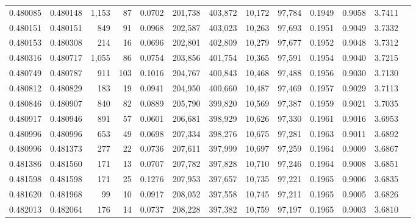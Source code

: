 \begin{tabular}{rrrrrrrrrrrrr}
0.480085 & 0.480148 & 1,153 &    87 &                                     0.0702 & 201,738 & 403,872 &  10,172 &  97,784 & 0.1949 & 0.9058 & 3.7411 \\
0.480151 & 0.480151 &   849 &    91 &                                     0.0968 & 202,587 & 403,023 &  10,263 &  97,693 & 0.1951 & 0.9049 & 3.7332 \\
0.480153 & 0.480308 &   214 &    16 &                                     0.0696 & 202,801 & 402,809 &  10,279 &  97,677 & 0.1952 & 0.9048 & 3.7312 \\
0.480316 & 0.480717 & 1,055 &    86 &                                     0.0754 & 203,856 & 401,754 &  10,365 &  97,591 & 0.1954 & 0.9040 & 3.7215 \\
0.480749 & 0.480787 &   911 &   103 &                                     0.1016 & 204,767 & 400,843 &  10,468 &  97,488 & 0.1956 & 0.9030 & 3.7130 \\
0.480812 & 0.480829 &   183 &    19 &                                     0.0941 & 204,950 & 400,660 &  10,487 &  97,469 & 0.1957 & 0.9029 & 3.7113 \\
0.480846 & 0.480907 &   840 &    82 &                                     0.0889 & 205,790 & 399,820 &  10,569 &  97,387 & 0.1959 & 0.9021 & 3.7035 \\
0.480917 & 0.480946 &   891 &    57 &                                     0.0601 & 206,681 & 398,929 &  10,626 &  97,330 & 0.1961 & 0.9016 & 3.6953 \\
0.480996 & 0.480996 &   653 &    49 &                                     0.0698 & 207,334 & 398,276 &  10,675 &  97,281 & 0.1963 & 0.9011 & 3.6892 \\
0.480996 & 0.481373 &   277 &    22 &                                     0.0736 & 207,611 & 397,999 &  10,697 &  97,259 & 0.1964 & 0.9009 & 3.6867 \\
0.481386 & 0.481560 &   171 &    13 &                                     0.0707 & 207,782 & 397,828 &  10,710 &  97,246 & 0.1964 & 0.9008 & 3.6851 \\
0.481598 & 0.481598 &   171 &    25 &                                     0.1276 & 207,953 & 397,657 &  10,735 &  97,221 & 0.1965 & 0.9006 & 3.6835 \\
0.481620 & 0.481968 &    99 &    10 &                                     0.0917 & 208,052 & 397,558 &  10,745 &  97,211 & 0.1965 & 0.9005 & 3.6826 \\
0.482013 & 0.482064 &   176 &    14 &                                     0.0737 & 208,228 & 397,382 &  10,759 &  97,197 & 0.1965 & 0.9003 & 3.6810 \\

\end{tabular}
